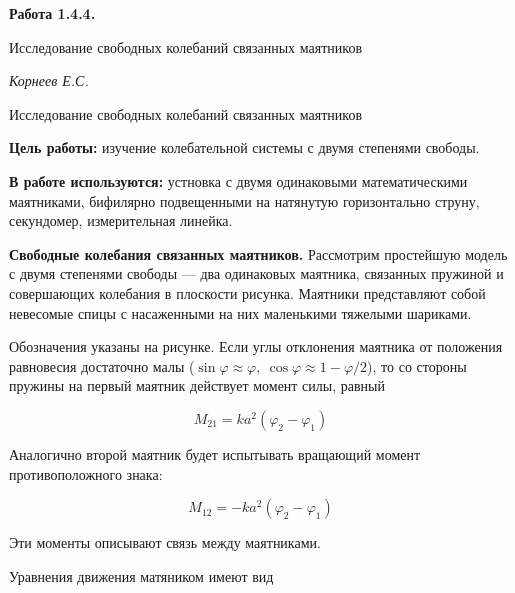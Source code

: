 \documentclass[14pt]{article}
\begin{document}
\begin{titlepage}
	\begin{center}
		\fontsize{18pt}{20pt}\selectfont
		\textbf{Работа 1.4.4.}	
	
		\vspace{5cm}
		\fontsize{24pt}{25pt}\selectfont
		Исследование свободных колебаний связанных маятников
	\end{center}
	\begin{flushright}
		\fontsize{18pt}{20pt}\selectfont
		\vspace{14cm}
		\hspace{-3cm}
		\textit{Корнеев Е.С.}
	\end{flushright}		
\end{titlepage}

\begin{center}
	\fontsize{16pt}{18pt}\selectfont	
	Исследование свободных колебаний связанных маятников
\end{center}

\fontsize{14pt}{16pt}\selectfont
\vspace{1cm}
\textbf{Цель работы:} изучение колебательной системы с двумя степенями свободы.

\vspace{0.5cm}
\textbf{В работе используются:} устновка с двумя одинаковыми математическими маятниками, бифилярно подвещенными на натянутую горизонтально струну, секундомер, измерительная линейка.

\vspace{1cm}
\textbf{Свободные колебания связанных маятников.} Рассмотрим простейшую модель с двумя степенями свободы --- два одинаковых маятника, связанных пружиной и совершающих колебания в плоскости рисунка. Маятники представляют собой невесомые спицы с насаженными на них маленькими тяжелыми шариками.

Обозначения указаны на рисунке. Если углы отклонения маятника от положения равновесия достаточно малы 
($\sin\varphi \approx \varphi,~\cos\varphi \approx 1 - \varphi/2$), то со стороны пружины на первый маятник действует момент силы, равный

$$M_{21} = ka^2(\varphi_2 - \varphi_1)$$

\noindent Аналогично второй маятник будет испытывать вращающий момент противоположного знака:

$$M_{12} = -ka^2(\varphi_2 - \varphi_1)$$

\noindent Эти моменты описывают связь между маятниками.

Уравнения движения матяником имеют вид
\end{document}
